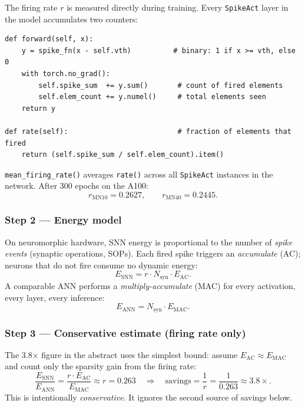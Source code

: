 \documentclass[11pt,a4paper]{article}
\begin{document}
The firing rate $r$ is measured directly during training. Every \texttt{SpikeAct} layer in the model accumulates two counters:

\begin{lstlisting}[caption={Firing-rate tracking in \texttt{SpikeAct} (train\_a100.py lines 323--331).}]
def forward(self, x):
    y = spike_fn(x - self.vth)          # binary: 1 if x >= vth, else 0
    with torch.no_grad():
        self.spike_sum  += y.sum()       # count of fired elements
        self.elem_count += y.numel()     # total elements seen
    return y

def rate(self):                          # fraction of elements that fired
    return (self.spike_sum / self.elem_count).item()
\end{lstlisting}

\texttt{mean\_firing\_rate()} averages \texttt{rate()} across all \texttt{SpikeAct} instances in the network. After 300 epochs on the A100:
\[
r_{\text{MN10}} = 0.2627, \qquad r_{\text{MN40}} = 0.2445.
\]

\subsubsection*{Step 2 — Energy model}

On neuromorphic hardware, SNN energy is proportional to the number of \emph{spike events} (synaptic operations, SOPs). Each fired spike triggers an \emph{accumulate} (AC); neurons that do not fire consume no dynamic energy:
\[
E_{\text{SNN}} = r \cdot N_{\text{syn}} \cdot E_{\text{AC}}.
\]
A comparable ANN performs a \emph{multiply-accumulate} (MAC) for every activation, every layer, every inference:
\[
E_{\text{ANN}} = N_{\text{syn}} \cdot E_{\text{MAC}}.
\]

\subsubsection*{Step 3 — Conservative estimate (firing rate only)}

The 3.8$\times$ figure in the abstract uses the simplest bound: assume $E_{\text{AC}} \approx E_{\text{MAC}}$ and count only the sparsity gain from the firing rate:
\[
\frac{E_{\text{SNN}}}{E_{\text{ANN}}} = \frac{r \cdot E_{\text{AC}}}{E_{\text{MAC}}} \approx r = 0.263
\quad\Longrightarrow\quad
\text{savings} = \frac{1}{r} = \frac{1}{0.263} \approx \mathbf{3.8\times}.
\]
This is intentionally \emph{conservative}. It ignores the second source of savings below.
\end{document}
